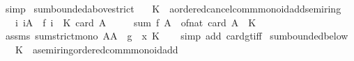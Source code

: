 \begin{isabellebody}
\ simp%
\endisatagproof
{\isafoldproof}%
%
\isadelimproof
\isanewline
%
\endisadelimproof
\isanewline
{}\isamarkupfalse%
\ sum{\isacharunderscore}{\kern0pt}bounded{\isacharunderscore}{\kern0pt}above{\isacharunderscore}{\kern0pt}strict{\isacharcolon}{\kern0pt}\isanewline
\ \ \ K\ {\isacharcolon}{\kern0pt}{\isacharcolon}{\kern0pt}\ {\isachardoublequoteopen}{\isacharprime}{\kern0pt}a{\isacharcolon}{\kern0pt}{\isacharcolon}{\kern0pt}{\isacharbraceleft}{\kern0pt}ordered{\isacharunderscore}{\kern0pt}cancel{\isacharunderscore}{\kern0pt}comm{\isacharunderscore}{\kern0pt}monoid{\isacharunderscore}{\kern0pt}add{\isacharcomma}{\kern0pt}semiring{\isacharunderscore}{\kern0pt}{}{\isacharbraceright}{\kern0pt}{\isachardoublequoteclose}\isanewline
\ \ \ {\isachardoublequoteopen}{\isasymAnd}i{\isachardot}{\kern0pt}\ i{\isasymin}A\ {\isasymLongrightarrow}\ f\ i\ {\isacharless}{\kern0pt}\ K{\isachardoublequoteclose}\ {\isachardoublequoteopen}card\ A\ {\isachargreater}{\kern0pt}\ {}{\isachardoublequoteclose}\isanewline
\ \ \ {\isachardoublequoteopen}sum\ f\ A\ {\isacharless}{\kern0pt}\ of{\isacharunderscore}{\kern0pt}nat\ {\isacharparenleft}{\kern0pt}card\ A{\isacharparenright}{\kern0pt}\ {\isacharasterisk}{\kern0pt}\ K{\isachardoublequoteclose}\isanewline
%
\isadelimproof
\ \ %
\endisadelimproof
%
\isatagproof
{}\isamarkupfalse%
\ assms\ sum{\isacharunderscore}{\kern0pt}strict{\isacharunderscore}{\kern0pt}mono{\isacharbrackleft}{\kern0pt}\ A{\isacharequal}{\kern0pt}A\ \ g\ {\isacharequal}{\kern0pt}\ {\isachardoublequoteopen}{\isasymlambda}x{\isachardot}{\kern0pt}\ K{\isachardoublequoteclose}{\isacharbrackright}{\kern0pt}\isanewline
\ \ \isamarkupfalse%
\ {\isacharparenleft}{\kern0pt}simp\ add{\isacharcolon}{\kern0pt}\ card{\isacharunderscore}{\kern0pt}gt{\isacharunderscore}{\kern0pt}{}{\isacharunderscore}{\kern0pt}iff{\isacharparenright}{\kern0pt}%
\endisatagproof
{\isafoldproof}%
%
\isadelimproof
\isanewline
%
\endisadelimproof
\isanewline
{}\isamarkupfalse%
\ sum{\isacharunderscore}{\kern0pt}bounded{\isacharunderscore}{\kern0pt}below{\isacharcolon}{\kern0pt}\isanewline
\ \ \ K\ {\isacharcolon}{\kern0pt}{\isacharcolon}{\kern0pt}\ {\isachardoublequoteopen}{\isacharprime}{\kern0pt}a{\isacharcolon}{\kern0pt}{\isacharcolon}{\kern0pt}{\isacharbraceleft}{\kern0pt}semiring{\isacharunderscore}{\kern0pt}{}{\isacharcomma}{\kern0pt}ordered{\isacharunderscore}{\kern0pt}comm{\isacharunderscore}{\kern0pt}monoid{\isacharunderscore}{\kern0pt}add{\isacharbraceright}{\kern0pt}{\isachardoublequoteclose}\isanewline

\end{isabellebody}
